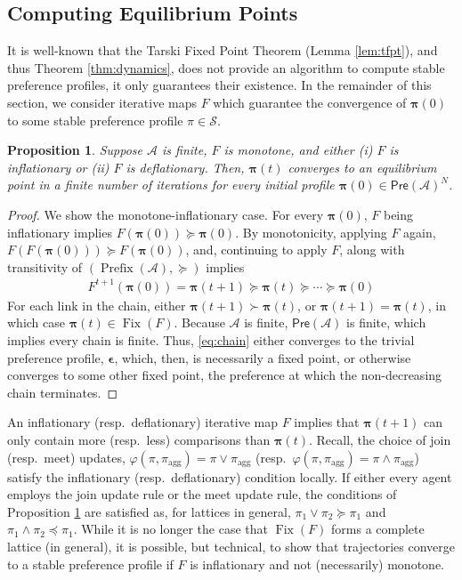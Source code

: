 \documentclass[conference]{ieeeconf}
\newcommand{\A}{\mathcal{A}}
\renewcommand{\SS}{\mathcal{S}}
\newcommand{\Pref}{\mathsf{Pre}}
\newcommand{\profile}{\boldsymbol{\pi}}
\newcommand{\join}{\vee}
\newcommand{\meet}{\wedge}
\DeclareMathOperator{\Fix}{Fix}
\DeclareMathOperator{\Pre}{Prefix}
\newtheorem{proposition}{Proposition}
\begin{document}
\subsection{Computing Equilibrium Points}

It is well-known that the Tarski Fixed Point Theorem (Lemma \ref{lem:tfpt}), and thus Theorem \ref{thm:dynamics}, does not provide an algorithm to compute stable preference profiles, it only guarantees their existence. In the remainder of this section, we consider iterative maps $F$ which guarantee the convergence of $\profile(0)$ to some stable preference profile $\pi \in \SS$.

\begin{proposition} \label{prop:monotone-inflationary}
    Suppose $\A$ is finite, $F$ is monotone, and either (i) $F$ is inflationary or (ii) $F$ is deflationary. Then, $\profile(t)$ converges to an equilibrium point in a finite number of iterations for every initial profile $\profile(0) \in \Pref(\A)^N$.
\end{proposition}
\begin{proof}
    We show the monotone-inflationary case. For every $\profile(0)$, $F$ being inflationary implies $F(\profile(0)) \succeq \profile(0)$. By monotonicity, applying $F$ again, $F\left( F(\profile(0))\right) \succeq F(\profile(0))$, and, continuing to apply $F$, along with transitivity of $(\Pre(\A),\succeq)$ implies 
    \begin{align}
        F^{t+1}\left( \profile(0)\right)  = \profile(t+1) \succeq \profile(t) \succeq \cdots \succeq \profile(0) \label{eq:chain}
    \end{align} For each link in the chain, either $\profile(t+1) \succ \profile(t)$, or $\profile(t+1) = \profile(t)$, in which case $\profile(t) \in \Fix(F)$. Because $\A$ is finite, $\Pref(\A)$ is finite, which implies every chain is finite. Thus, \eqref{eq:chain} either converges to the trivial preference profile, $\boldsymbol{\epsilon}$, which, then, is necessarily a fixed point, or otherwise converges to some other fixed point, the preference at which the non-decreasing chain terminates.
\end{proof}

An inflationary (resp.~deflationary) iterative map $F$ implies that $\profile(t+1)$ can only contain more (resp.~less) comparisons than $\profile(t)$. Recall, the choice of join (resp.~meet) updates, $\varphi(\pi,\pi_{\text{agg}}) = \pi \join \pi_{\text{agg}}$ (resp.~$\varphi(\pi,\pi_{\text{agg}}) = \pi \meet \pi_{\text{agg}}$) satisfy the inflationary (resp.~deflationary) condition locally. If either every agent employs the join update rule or the meet update rule, the conditions of Proposition \ref{prop:monotone-inflationary} are satisfied as, for lattices in general, $\pi_1 \join \pi_2 \succeq \pi_1$ and $\pi_1 \meet \pi_2 \preceq \pi_1$. While it is no longer the case that $\Fix(F)$ forms a complete lattice (in general), it is possible, but technical, to show that trajectories converge to a stable preference profile if $F$ is inflationary and not (necessarily) monotone.
\end{document}
